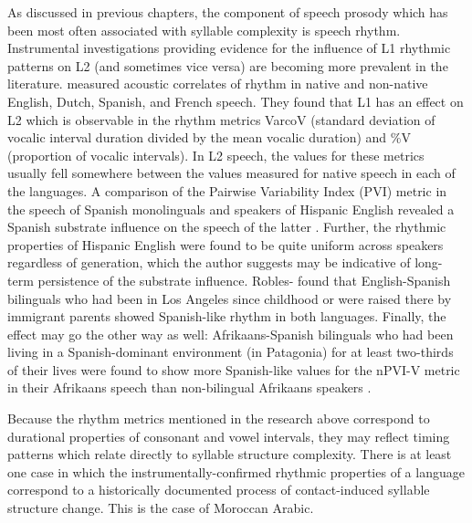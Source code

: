   As discussed in previous chapters, the component of speech prosody which has been most often associated with syllable complexity is speech rhythm. Instrumental investigations providing evidence for the influence of L1 rhythmic patterns on L2 (and sometimes vice versa) are becoming more prevalent in the literature. \citet{WhiteMattys2007} measured acoustic correlates of rhythm in native and non-native English, Dutch, Spanish, and French speech. They found that L1 has an effect on L2 which is observable in the rhythm metrics VarcoV (standard deviation of vocalic interval duration divided by the mean vocalic duration) and \%V (proportion of vocalic intervals). In L2 speech, the values for these metrics usually fell somewhere between the values measured for native speech in each of the languages. A comparison of the Pairwise Variability Index (PVI) metric in the speech of Spanish monolinguals and speakers of Hispanic English revealed a Spanish substrate influence on the speech of the latter \citep{Carter2005}. Further, the rhythmic properties of Hispanic English were found to be quite uniform across speakers regardless of generation, which the author suggests may be indicative of long-term persistence of  the substrate influence. Robles-\citet{Puente2014} found that English-Spanish bilinguals who had been in Los Angeles since childhood or were raised there by immigrant parents showed Spanish-like rhythm in both languages. Finally, the effect may go the other way as well: Afrikaans-Spanish bilinguals who had been living in a Spanish-dominant environment (in Patagonia) for at least two-thirds of their lives were found to show more Spanish-like values for the nPVI-V metric in their Afrikaans speech than non-bilingual Afrikaans speakers \citep{CoetzeeEtAl2015}. 

  Because the rhythm metrics mentioned in the research above correspond to durational properties of consonant and vowel intervals, they may reflect timing patterns which relate directly to syllable structure complexity. There is at least one case in which the instrumentally-confirmed rhythmic properties of a language correspond to a historically documented process of contact-induced syllable structure change. This is the case of Moroccan Arabic.

